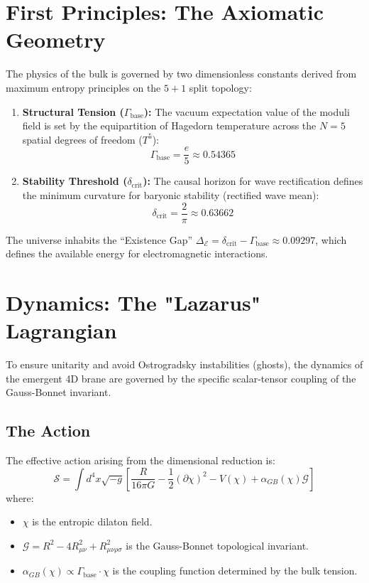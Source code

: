 \documentclass[aps,prd,twocolumn,superscriptaddress,showpacs,amsmath,amssymb,floatfix,nofootinbib]{revtex4-2}
\newcommand{\Gap}{\Delta_{\mathcal{E}}}
\newcommand{\Tension}{\Gamma_{\mathrm{base}}}
\newcommand{\Threshold}{\delta_{\mathrm{crit}}}
\begin{document}
\section{First Principles: The Axiomatic Geometry}

The physics of the bulk is governed by two dimensionless constants derived from maximum entropy principles on the $5+1$ split topology:

\begin{enumerate}
    \item \textbf{Structural Tension ($\Tension$):} The vacuum expectation value of the moduli field is set by the equipartition of Hagedorn temperature across the $N=5$ spatial degrees of freedom ($T^5$):
    \begin{equation}
    \Tension = \frac{e}{5} \approx 0.54365
    \end{equation}
    
    \item \textbf{Stability Threshold ($\Threshold$):} The causal horizon for wave rectification defines the minimum curvature for baryonic stability (rectified wave mean):
    \begin{equation}
    \Threshold = \frac{2}{\pi} \approx 0.63662
    \end{equation}
\end{enumerate}

The universe inhabits the ``Existence Gap'' $\Gap = \Threshold - \Tension \approx 0.09297$, which defines the available energy for electromagnetic interactions.

\section{Dynamics: The "Lazarus" Lagrangian}

To ensure unitarity and avoid Ostrogradsky instabilities (ghosts), the dynamics of the emergent 4D brane are governed by the specific scalar-tensor coupling of the Gauss-Bonnet invariant.

\subsection{The Action}
The effective action arising from the dimensional reduction is:
\begin{equation}
\mathcal{S} = \int d^4x \sqrt{-g} \left[ \frac{R}{16\pi G} - \frac{1}{2}(\partial \chi)^2 - V(\chi) + \alpha_{GB}(\chi) \mathcal{G} \right]
\label{eq:lagrangian}
\end{equation}
where:
\begin{itemize}
    \item $\chi$ is the entropic dilaton field.
    \item $\mathcal{G} = R^2 - 4R_{\mu\nu}^2 + R_{\mu\nu\rho\sigma}^2$ is the Gauss-Bonnet topological invariant.
    \item $\alpha_{GB}(\chi) \propto \Tension \cdot \chi$ is the coupling function determined by the bulk tension.
\end{itemize}
\end{document}
